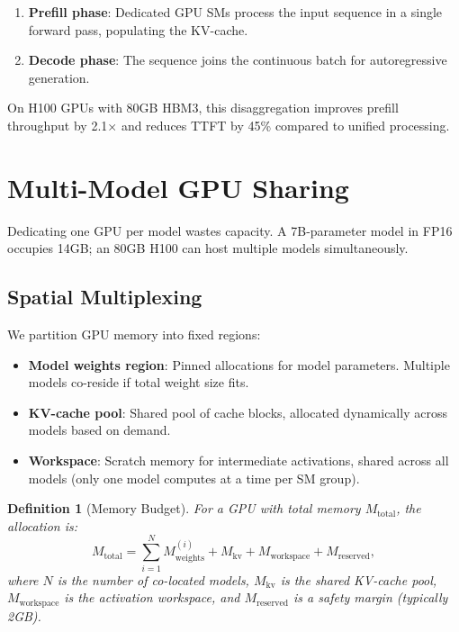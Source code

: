 \documentclass[11pt]{article}
\newtheorem{definition}{Definition}
\begin{document}
\begin{enumerate}[leftmargin=1.4em]
    \item \textbf{Prefill phase}: Dedicated GPU SMs process the input sequence
    in a single forward pass, populating the KV-cache.
    \item \textbf{Decode phase}: The sequence joins the continuous batch for
    autoregressive generation.
\end{enumerate}

On H100 GPUs with 80GB HBM3, this disaggregation improves prefill throughput by
2.1$\times$ and reduces TTFT by 45\% compared to unified processing.

\section{Multi-Model GPU Sharing}
\label{sec:sharing}

Dedicating one GPU per model wastes capacity. A 7B-parameter model in FP16
occupies 14GB; an 80GB H100 can host multiple models simultaneously.

\subsection{Spatial Multiplexing}

We partition GPU memory into fixed regions:
\begin{itemize}[leftmargin=1.1em]
    \item \textbf{Model weights region}: Pinned allocations for model parameters.
    Multiple models co-reside if total weight size fits.
    \item \textbf{KV-cache pool}: Shared pool of cache blocks, allocated
    dynamically across models based on demand.
    \item \textbf{Workspace}: Scratch memory for intermediate activations,
    shared across all models (only one model computes at a time per SM group).
\end{itemize}

\begin{definition}[Memory Budget]
For a GPU with total memory $M_{\text{total}}$, the allocation is:
\begin{equation}
M_{\text{total}} = \sum_{i=1}^{N} M_{\text{weights}}^{(i)} +
M_{\text{kv}} + M_{\text{workspace}} + M_{\text{reserved}},
\end{equation}
where $N$ is the number of co-located models, $M_{\text{kv}}$ is the shared
KV-cache pool, $M_{\text{workspace}}$ is the activation workspace, and
$M_{\text{reserved}}$ is a safety margin (typically 2GB).
\end{definition}
\end{document}
